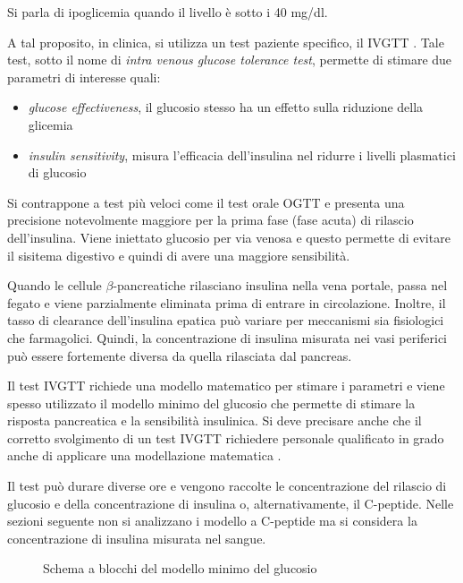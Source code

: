 Si parla di ipoglicemia quando il livello è sotto i 40 mg/dl.

A tal proposito, in clinica, si utilizza un test paziente specifico, il IVGTT \cite{darden_predicting_2020-1}. Tale test, sotto il nome di \textit{intra venous glucose tolerance test}, permette di stimare due parametri di interesse quali:

\begin{itemize}
	\item \textit{glucose effectiveness}, il glucosio stesso ha un effetto sulla riduzione della glicemia
	\item \textit{insulin sensitivity}, misura l'efficacia dell'insulina nel ridurre i livelli plasmatici di glucosio
\end{itemize}

Si contrappone a test più veloci come il test orale OGTT e presenta una precisione notevolmente maggiore per la prima fase (fase acuta) di rilascio dell'insulina. Viene iniettato glucosio per via venosa e questo permette di evitare il sisitema digestivo e quindi di avere una maggiore sensibilità.

Quando le cellule $\beta$-pancreatiche rilasciano insulina nella vena portale, passa nel fegato e viene parzialmente eliminata prima di entrare in circolazione. Inoltre, il tasso di clearance dell'insulina epatica può variare per meccanismi sia fisiologici che farmagolici. Quindi, la concentrazione di insulina misurata nei vasi periferici può essere fortemente diversa da quella rilasciata dal pancreas.

Il test IVGTT richiede una modello matematico per stimare i parametri e viene spesso utilizzato il modello minimo del glucosio che permette di stimare la risposta pancreatica e la sensibilità insulinica. Si deve precisare anche che il corretto svolgimento di un test IVGTT richiedere personale qualificato in grado anche di applicare una modellazione matematica \cite{cersosimo_assessment_nodate}. 

Il test può durare diverse ore e vengono raccolte le concentrazione del rilascio di glucosio e della concentrazione di insulina o, alternativamente, il C-peptide. Nelle sezioni seguente non si analizzano i modello a C-peptide ma si considera la concentrazione di insulina misurata nel sangue.





\begin{figure}[t!]
	\centering
		\scriptsize{\def\svgwidth{0.95\linewidth}
		}
	\caption{Schema a blocchi del modello minimo del glucosio}
	\label{fig:modellominimo}
\end{figure}


